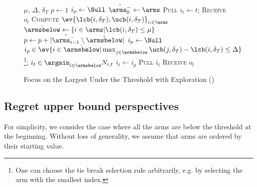 \begin{figure*}[ht]
\begin{minipage}{\textwidth}
\renewcommand*\footnoterule{}
\begin{savenotes}
\begin{algorithm}[H]
\caption{Focus on the Largest Under the Threshold with Exploration ({\FLUTE})}
\label{alg:flute}
\begin{algorithmic}[1]
\Require $\mu$, $\Delta$, $\delta_T$
\State $p \leftarrow 1$
\State $i_p \leftarrow \Null$ 
\State $\hat{\arms_{0}^-} \leftarrow \arms$
	\State \textsc{Pull}  $i_t \gets t$; \textsc{Receive} $o_{t}$
\EndFor
{}
		\State \textsc{Compute} $\ev{\lcb(i,\delta_T), \ucb(i,\delta_T)}_{i,\in \arms}$ {\footnotesize {}}
		\State $\hat{\armsbelow} \leftarrow \left\{i \in \arms | \lcb(i,\delta_T) \leq \mu \right\}$\label{algline:flute-armsbelow}
		\State $p \leftarrow p + | \hat{\arms_{t-1}^-} \setminus \hat{\armsbelow}|$ 	\label{algline:flute-phase-increase}
		\label{algline:flute-phase-cond}
		\State $i_p \leftarrow \Null$ 
	\EndIf
	\State $i_p \in \ev{i \in \hat{\armsbelow} | \max_{j \in \hat{\armsbelow}} \ucb(j,\delta_T) - \lcb(i,\delta_T) \leq \Delta}$\footnote{One can choose the tie break selection rule arbitrarily, e.g. by selecting the arm with the smallest index.};\label{algline:flute-ip-select}
	\EndIf
	\State $i_t \in \argmin_{i \in \hat{\armsbelow}} N_{i,t}$\label{algline:flute-pull-it}
	\Else 
	\State $i_t \leftarrow i_p$ \label{algline:flute-pull-ip}
	\EndIf
	\State \textsc{Pull} $i_t $ \textsc{Receive} $o_{t}$
\EndFor
\end{algorithmic}
\end{algorithm}
\end{savenotes}
\end{minipage}
\end{figure*}



\subsection{Regret upper bound perspectives}
For simplicity, we consider the case where all the arms are below the threshold at the beginning. Without loss of generality, we assume that arms are ordered by their starting value. 


